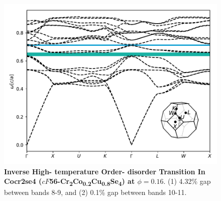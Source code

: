 \documentclass[fleqn,amsmath,amssymb,superscriptaddress, reprint,prl]{revtex4-1}
\begin{document}
\begin{figure}
\includegraphics[width=0.9\linewidth]{workspace/364cb37d147ba00ade326bce5b97ab0a/images/r=24.pdf}
	\caption{\textbf{Inverse High-  temperature Order-  disorder Transition In Cocr2se4 ($cF$56-Cr\textsubscript{2}Co\textsubscript{0}\textsubscript{.}\textsubscript{2}Cu\textsubscript{0}\textsubscript{.}\textsubscript{8}Se\textsubscript{4}) at $\phi=0.16$}. (1) 4.32\% gap between bands 8-9, and (2) 0.1\% gap between bands 10-11.}
\end{figure}
\end{document}
